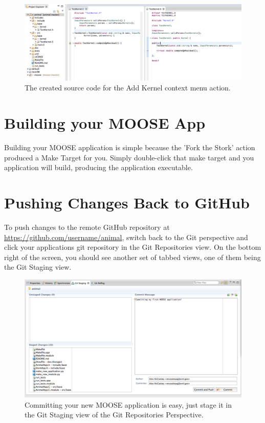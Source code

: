 \begin{figure}[htbp]
\centering
\includegraphics[width=\textwidth]{figures/kernel_source.png}
\caption{The created source code for the Add Kernel context menu action. }
\end{figure}

\section{Building your MOOSE App}\label{building-your-moose-app}

Building your MOOSE application is simple because the 'Fork the Stork'
action produced a Make Target for you. Simply double-click that make
target and you application will build, producing the application
executable.

\section{Pushing Changes Back to
GitHub}\label{pushing-changes-back-to-github}

To push changes to the remote GitHub repository at
\url{https://github.com/username/animal}, switch back to the Git
perspective and click your applications git repository in the Git
Repositories view. On the bottom right of the screen, you should see
another set of tabbed views, one of them being the Git Staging view.

\begin{figure}[htbp]
\centering
\includegraphics[width=\textwidth]{figures/git_commit.png}
\caption{Committing your new MOOSE application is easy, just stage it in the Git Staging view of the Git Repositories Perspective.}
\end{figure}

